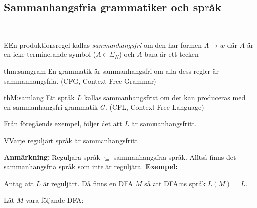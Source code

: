 \subsection{Sammanhangsfria grammatiker och språk}\hfill\\
\par\bigskip
\begin{theo}
  EEn produktionsregel kallas \textit{sammanhangsfri} om den har formen $A\to w$ där $A$ är en icke terminerande symbol ($A\in\Sigma_N$) och $A$ bara är ett tecken
\end{theo}
\par\bigskip
\begin{theo}{thm:samgram}
  En grammatik är sammanhangsfri om alla dess regler är sammanhangsfria. (CFG, Context Free Grammar)
\end{theo}
\par\bigskip
\begin{theo}{thM:samlang}
  Ett språk $L$ kallas sammanhangsfritt om det kan produceras med en sammanhangsfri grammatik $G$. (CFL, Context Free Language)
\end{theo}
\par\bigskip
\noindent Från föregående exempel, följer det att $L$ är sammanhangsfritt.
\par\bigskip
\begin{theo}
  VVarje reguljärt språk är sammanhangsfritt
\end{theo}
\par\bigskip
\noindent\textbf{Anmärkning:} Reguljära språk $\subseteq$ sammanhangsfria språk. Alltså finns det sammanhangsfria språk som inte är reguljära.
\newpage
\noindent\textbf{Exempel:}\par
\noindent Antag att $L$ är reguljärt. Då finns en DFA $M$ så att DFA:ns språk $L(M) = L$.\par
\noindent Låt $M$ vara följande DFA:
\begin{figure}[ht!]
    \centering
    \caption{}
\end{figure}\par
